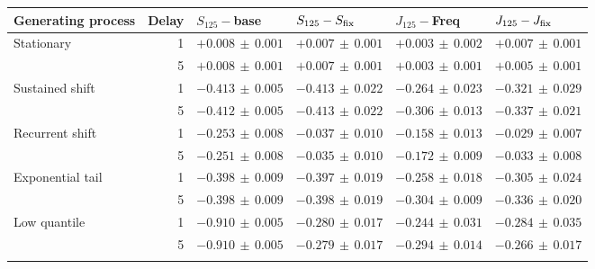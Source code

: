 \begin{tabular}{lrllll}
\toprule
Generating process & Delay & $S_{125}-$base & $S_{125}-S_{\rm fix}$ & $J_{125}-$Freq & $J_{125}-J_{\rm fix}$ \\
\midrule
Stationary & 1 & $+0.008\,\pm\,0.001$ & $+0.007\,\pm\,0.001$ & $+0.003\,\pm\,0.002$ & $+0.007\,\pm\,0.001$ \\
 & 5 & $+0.008\,\pm\,0.001$ & $+0.007\,\pm\,0.001$ & $+0.003\,\pm\,0.001$ & $+0.005\,\pm\,0.001$ \\
\addlinespace[2pt]
Sustained shift & 1 & $-0.413\,\pm\,0.005$ & $-0.413\,\pm\,0.022$ & $-0.264\,\pm\,0.023$ & $-0.321\,\pm\,0.029$ \\
 & 5 & $-0.412\,\pm\,0.005$ & $-0.413\,\pm\,0.022$ & $-0.306\,\pm\,0.013$ & $-0.337\,\pm\,0.021$ \\
\addlinespace[2pt]
Recurrent shift & 1 & $-0.253\,\pm\,0.008$ & $-0.037\,\pm\,0.010$ & $-0.158\,\pm\,0.013$ & $-0.029\,\pm\,0.007$ \\
 & 5 & $-0.251\,\pm\,0.008$ & $-0.035\,\pm\,0.010$ & $-0.172\,\pm\,0.009$ & $-0.033\,\pm\,0.008$ \\
\addlinespace[2pt]
Exponential tail & 1 & $-0.398\,\pm\,0.009$ & $-0.397\,\pm\,0.019$ & $-0.258\,\pm\,0.018$ & $-0.305\,\pm\,0.024$ \\
 & 5 & $-0.398\,\pm\,0.009$ & $-0.398\,\pm\,0.019$ & $-0.304\,\pm\,0.009$ & $-0.336\,\pm\,0.020$ \\
\addlinespace[2pt]
Low quantile & 1 & $-0.910\,\pm\,0.005$ & $-0.280\,\pm\,0.017$ & $-0.244\,\pm\,0.031$ & $-0.284\,\pm\,0.035$ \\
 & 5 & $-0.910\,\pm\,0.005$ & $-0.279\,\pm\,0.017$ & $-0.294\,\pm\,0.014$ & $-0.266\,\pm\,0.017$ \\
\addlinespace[2pt]
\bottomrule
\end{tabular}
